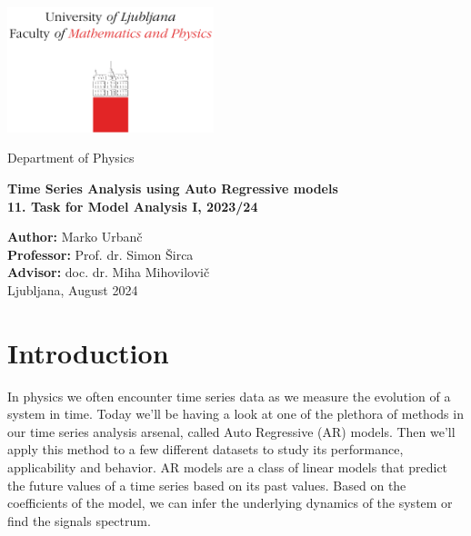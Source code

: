 \documentclass[10pt, titlepage, a4paper]{article}
\begin{document}
\begin{titlepage}
{\centering
\includegraphics[width=6cm]{logo_fmf.pdf}

\vspace{0.8cm}
{\small Department of Physics}

\vspace{5cm}
\vspace{0.5cm}
{\huge\textbf{Time Series Analysis using Auto Regressive models}} \\
\vspace{0.5cm}
{\large\textbf{11. Task for Model Analysis I, 2023/24}}

\vfill
\textbf{Author:} Marko Urbanč \\
\textbf{Professor:} Prof. dr. Simon Širca  \\ 
\textbf{Advisor:}  doc. dr. Miha Mihovilovič \\

\vspace{1cm}
Ljubljana, August 2024 \\
}
\vspace{3cm}
\end{titlepage}

\hypersetup{pageanchor=true}
\setcounter{page}{2}
\tableofcontents
\vspace{1cm}


\section{Introduction}
In physics we often encounter time series data as we measure the evolution of a system in time. Today we'll be having 
a look at one of the plethora of methods in our time series analysis arsenal, called Auto Regressive (AR) models. Then 
we'll apply this method to a few different datasets to study its performance, applicability and behavior. AR models are 
a class of linear models that predict the future values of a time series based on its past values. Based on the 
coefficients of the model, we can infer the underlying dynamics of the system or find the signals spectrum. \\
\end{document}
